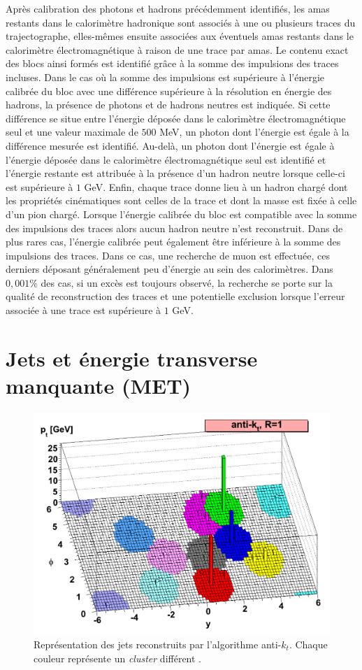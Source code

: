 Après calibration des photons et hadrons précédemment identifiés, les amas restants dans le calorimètre hadronique sont associés à une ou plusieurs traces du trajectographe, elles-mêmes ensuite associées aux éventuels amas restants dans le calorimètre électromagnétique à raison de une trace par amas. Le contenu exact des blocs ainsi formés est identifié grâce à la somme des impulsions des traces incluses. Dans le cas où la somme des impulsions est supérieure à l'énergie calibrée du bloc avec une différence supérieure à la résolution en énergie des hadrons, la présence de photons et de hadrons neutres est indiquée. Si cette différence se situe entre l'énergie déposée dans le calorimètre électromagnétique seul et une valeur maximale de $500$ MeV, un photon dont l'énergie est égale à la différence mesurée est identifié. Au-delà, un photon dont l'énergie est égale à l'énergie déposée dans le calorimètre électromagnétique seul est identifié et l'énergie restante est attribuée à la présence d'un hadron neutre lorsque celle-ci est supérieure à $1$ GeV. Enfin, chaque trace donne lieu à un hadron chargé dont les propriétés cinématiques sont celles de la trace et dont la masse est fixée à celle d'un pion chargé. Lorsque l'énergie calibrée du bloc est compatible avec la somme des impulsions des traces alors aucun hadron neutre n'est reconstruit. Dans de plus rares cas, l'énergie calibrée peut également être inférieure à la somme des impulsions des traces. Dans ce cas, une recherche de muon est effectuée, ces derniers déposant généralement peu d'énergie au sein des calorimètres. Dans $0,001\%$ des cas, si un excès est toujours observé, la recherche se porte sur la qualité de reconstruction des traces et une potentielle exclusion lorsque l'erreur associée à une trace est supérieure à $1$ GeV.

\section{Jets et énergie transverse manquante (MET)}
\label{JetMetID}

\begin{figure}
\centering
    \includegraphics[width=0.55\linewidth]{Chapitre4/Images/antikt.png} 
    \caption{Représentation des jets reconstruits par l'algorithme anti-$k_t$. Chaque couleur représente un \textit{cluster} différent \cite{antikt}.}
    \label{antikt}
\end{figure} 

